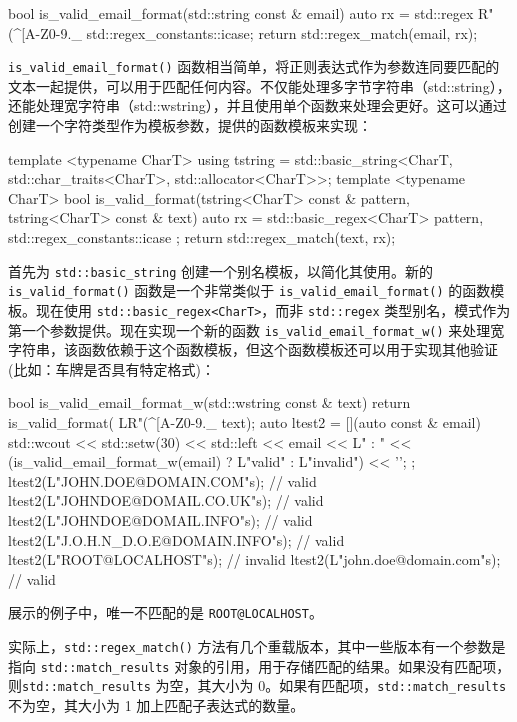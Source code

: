 \begin{cpp}
bool is_valid_email_format(std::string const & email)
{
    auto rx = std::regex{
        R"(^[A-Z0-9._%
        std::regex_constants::icase};
    return std::regex_match(email, rx);
}
\end{cpp}

\verb|is_valid_email_format()| 函数相当简单，将正则表达式作为参数连同要匹配的文本一起提供，可以用于匹配任何内容。不仅能处理多字节字符串（std::string），还能处理宽字符串（std::wstring），并且使用单个函数来处理会更好。这可以通过创建一个字符类型作为模板参数，提供的函数模板来实现：

\begin{cpp}
template <typename CharT>
using tstring = std::basic_string<CharT, std::char_traits<CharT>,
                                  std::allocator<CharT>>;
template <typename CharT>
bool is_valid_format(tstring<CharT> const & pattern,
                     tstring<CharT> const & text)
{
    auto rx = std::basic_regex<CharT>{ pattern, std::regex_constants::icase };
    return std::regex_match(text, rx);
}
\end{cpp}

首先为 \verb|std::basic_string| 创建一个别名模板，以简化其使用。新的 \verb|is_valid_format()| 函数是一个非常类似于 \verb|is_valid_email_format()| 的函数模板。现在使用 \verb|std::basic_regex<CharT>|，而非 \verb|std::regex| 类型别名，模式作为第一个参数提供。现在实现一个新的函数 \verb|is_valid_email_format_w()| 来处理宽字符串，该函数依赖于这个函数模板，但这个函数模板还可以用于实现其他验证(比如：车牌是否具有特定格式)：

\begin{cpp}
bool is_valid_email_format_w(std::wstring const & text)
{
    return is_valid_format(
    LR"(^[A-Z0-9._%
    text);
}
auto ltest2 = [](auto const & email)
{
    std::wcout << std::setw(30) << std::left
    << email << L" : "
    << (is_valid_email_format_w(email) ? L"valid" : L"invalid")
    << '\n';
};
ltest2(L"JOHN.DOE@DOMAIN.COM"s);       // valid
ltest2(L"JOHNDOE@DOMAIL.CO.UK"s);      // valid
ltest2(L"JOHNDOE@DOMAIL.INFO"s);       // valid
ltest2(L"J.O.H.N_D.O.E@DOMAIN.INFO"s); // valid
ltest2(L"ROOT@LOCALHOST"s);            // invalid
ltest2(L"john.doe@domain.com"s);       // valid
\end{cpp}

展示的例子中，唯一不匹配的是 \verb|ROOT@LOCALHOST|。

实际上，\verb|std::regex_match()| 方法有几个重载版本，其中一些版本有一个参数是指向 \verb|std::match_results| 对象的引用，用于存储匹配的结果。如果没有匹配项，则\verb|std::match_results| 为空，其大小为 0。如果有匹配项，\verb|std::match_results| 不为空，其大小为 1 加上匹配子表达式的数量。

